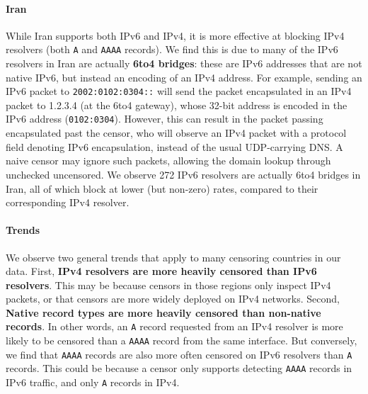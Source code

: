 \paragraph{Iran}
While Iran supports both IPv6 and IPv4, it is more effective at blocking IPv4
resolvers (both \texttt{A} and \texttt{AAAA} records). We find this is due to
many of the IPv6 resolvers in Iran are actually \textbf{6to4 bridges}: these
are IPv6 addresses that are not native IPv6, but instead an encoding of an IPv4
address. For example, sending an IPv6 packet to \texttt{2002:0102:0304::} will
send the packet encapsulated in an IPv4 packet to 1.2.3.4 (at the 6to4 gateway),
whose 32-bit address is encoded in the IPv6 address (\texttt{0102:0304}).
However, this can result in the packet passing encapsulated past the censor, who
will observe an IPv4 packet with a protocol field denoting IPv6 encapsulation,
instead of the usual UDP-carrying DNS. A naive censor may ignore such packets,
allowing the domain lookup through unchecked uncensored. We observe 272 IPv6
resolvers are actually 6to4 bridges in Iran, all of which block at lower
(but non-zero) rates, compared to their corresponding IPv4 resolver.

%




\paragraph{Trends}
We observe two general trends that apply to many censoring countries in our data.
First, \textbf{IPv4 resolvers are more heavily censored than IPv6 resolvers}.
This may be because censors in those regions only inspect IPv4 packets, or that
censors are more widely deployed on IPv4 networks. Second, \textbf{Native record
types are more heavily censored than non-native records}. In other words, an
\texttt{A} record requested from an IPv4 resolver is more likely to be censored
than a \texttt{AAAA} record from the same interface. But conversely, we find
that \texttt{AAAA} records are also more often censored on IPv6 resolvers than
\texttt{A} records. This could be because a censor only supports detecting
\texttt{AAAA} records in IPv6 traffic, and only \texttt{A} records in IPv4.


